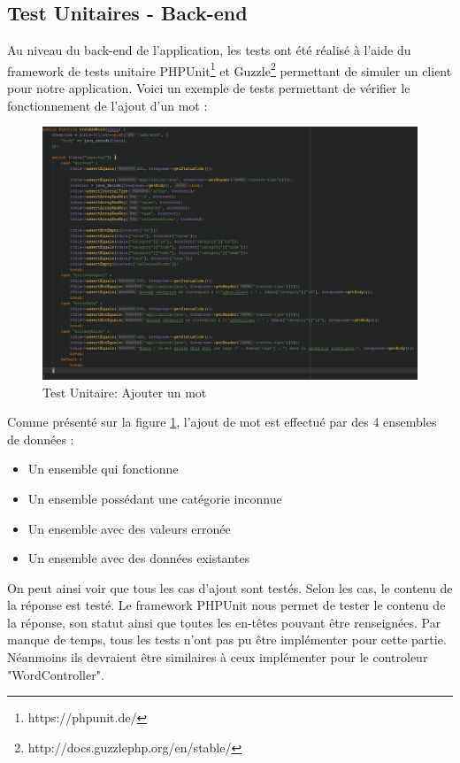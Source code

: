 \documentclass[12pt,a4paper]{article}
\begin{document}
\subsection{Test Unitaires - Back-end}

Au niveau du back-end de l'application, les tests ont été réalisé à l'aide du framework de tests unitaire PHPUnit\footnote{https://phpunit.de/} et Guzzle\footnote{http://docs.guzzlephp.org/en/stable/} permettant de simuler un client pour notre application.
Voici un exemple de tests permettant de vérifier le fonctionnement de l'ajout d'un mot :

\begin{figure}[h]
\centering
\includegraphics[width=170mm]{img/testaddWord.PNG}
\caption{Test Unitaire: Ajouter un mot}
\label{AddWordTest}
\end{figure}

\newpage
Comme présenté sur la figure \ref{AddWordTest}, l'ajout de mot est effectué par des 4 ensembles de données :
\begin{itemize}
  \item Un ensemble qui fonctionne
  \item Un ensemble possédant une catégorie inconnue
  \item Un ensemble avec des valeurs erronée
  \item Un ensemble avec des données existantes
\end{itemize}

On peut ainsi voir que tous les cas d'ajout sont testés. Selon les cas, le contenu de la réponse est testé.
Le framework PHPUnit nous permet de tester le contenu de la réponse, son statut ainsi que toutes les en-têtes pouvant être renseignées.
Par manque de temps, tous les tests n'ont pas pu être implémenter pour cette partie. Néanmoins ils devraient être similaires à ceux implémenter pour le controleur "WordController".
\end{document}
